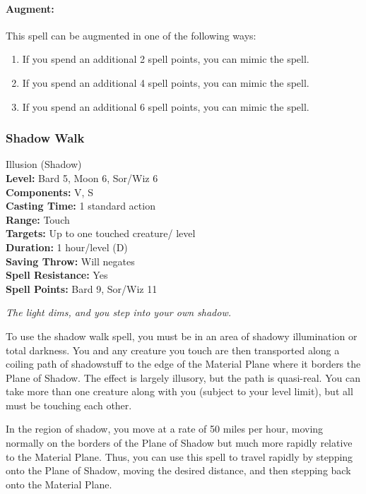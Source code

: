 \paragraph{Augment:} This spell can be augmented in one of the following ways:
\begin{enumerate}
 \item If you spend an additional 2 spell points, you can mimic the  spell.
 \item If you spend an additional 4 spell points, you can mimic the  spell.
 \item If you spend an additional 6 spell points, you can mimic the  spell.
\end{enumerate}
\subsubsection{Shadow Walk}
\label{Spell:ShadowWalk}
Illusion (Shadow)
\\ \textbf{Level:} Bard 5, Moon 6, Sor/Wiz 6
\\ \textbf{Components:} V, S
\\ \textbf{Casting Time:} 1 standard action
\\ \textbf{Range:} Touch
\\ \textbf{Targets:} Up to one touched creature/ level
\\ \textbf{Duration:} 1 hour/level (D)
\\ \textbf{Saving Throw:} Will negates
\\ \textbf{Spell Resistance:} Yes
\\ \textbf{Spell Points:} Bard 9, Sor/Wiz 11

\emph{The light dims, and you step into your own shadow.}

To use the shadow walk spell, you must be in an area of shadowy illumination or total darkness. 
You and any creature you touch are then transported along a coiling path of shadowstuff to the edge of the Material Plane where it borders the Plane of Shadow. 
The effect is largely illusory, but the path is quasi-real. 
You can take more than one creature along with you (subject to your level limit), but all must be touching each other.

In the region of shadow, you move at a rate of 50 miles per hour, moving normally on the borders of the Plane of Shadow but much more rapidly relative to the Material Plane. 
Thus, you can use this spell to travel rapidly by stepping onto the Plane of Shadow, moving the desired distance, and then stepping back onto the Material Plane.


